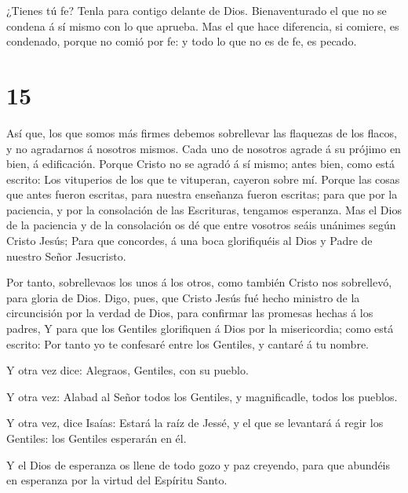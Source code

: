  ¿Tienes tú fe? Tenla para contigo delante de Dios.
Bienaventurado el que no se condena á sí mismo con lo que aprueba.
 Mas el que hace diferencia, si comiere, es condenado,
porque no comió por fe: y todo lo que no es de fe, es pecado.

\hypertarget{section-14}{%
\section{15}\label{section-14}}

 Así que, los que somos más firmes debemos sobrellevar las
flaquezas de los flacos, y no agradarnos á nosotros mismos. 
Cada uno de nosotros agrade á su prójimo en bien, á edificación.
 Porque Cristo no se agradó á sí mismo; antes bien, como
está escrito: Los vituperios de los que te vituperan, cayeron sobre mí.
 Porque las cosas que antes fueron escritas, para nuestra
enseñanza fueron escritas; para que por la paciencia, y por la
consolación de las Escrituras, tengamos esperanza.  Mas el
Dios de la paciencia y de la consolación os dé que entre vosotros seáis
unánimes según Cristo Jesús;  Para que concordes, á una boca
glorifiquéis al Dios y Padre de nuestro Señor Jesucristo.

 Por tanto, sobrellevaos los unos á los otros, como también
Cristo nos sobrellevó, para gloria de Dios.  Digo, pues, que
Cristo Jesús fué hecho ministro de la circuncisión por la verdad de
Dios, para confirmar las promesas hechas á los padres,  Y
para que los Gentiles glorifiquen á Dios por la misericordia; como está
escrito: Por tanto yo te confesaré entre los Gentiles, y cantaré á tu
nombre.

 Y otra vez dice: Alegraos, Gentiles, con su pueblo.

 Y otra vez: Alabad al Señor todos los Gentiles, y
magnificadle, todos los pueblos.

 Y otra vez, dice Isaías: Estará la raíz de Jessé, y el que
se levantará á regir los Gentiles: los Gentiles esperarán en él.

 Y el Dios de esperanza os llene de todo gozo y paz
creyendo, para que abundéis en esperanza por la virtud del Espíritu
Santo.

